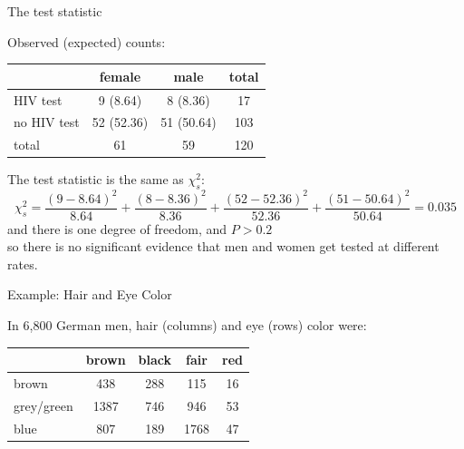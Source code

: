 \begin{frame}{The test statistic}

    Observed (expected) counts:
        \begin{center}
            \begin{tabular}{lcc|c}
                & female & male & total \\
                \hline
                HIV test & 9 (8.64) & 8 (8.36) & 17 \\
                no HIV test & 52 (52.36) & 51 (50.64) & 103 \\
                \hline
                total & 61 & 59 & 120 \\
            \end{tabular}
        \end{center}

    \vspace{2em}

    The test statistic is the \alert{same} as $\chi^2_s$:
    \[
        \chi^2_s = \frac{(9 - 8.64)^2}{8.64} + 
            \frac{(8 - 8.36)^2}{8.36} + 
            \frac{(52 - 52.36)^2}{52.36} + 
            \frac{(51 - 50.64)^2}{50.64} = 0.035
    \]
    and there is \alert{one} {degree of freedom}, and $P > 0.2$ \\
    so there is no significant evidence that men and women get tested at different rates.


\end{frame}

\begin{frame}{Example: Hair and Eye Color}

    In 6,800 German men, hair (columns) and eye (rows) color were:
        \begin{center}
            \begin{tabular}{l|cccc}
                & brown & black & fair & red \\
                \hline
                brown & 438 & 288 & 115 & 16 \\
                grey/green & 1387 & 746 & 946 & 53 \\
                blue & 807 & 189 & 1768 & 47 \\
            \end{tabular}
        \end{center}

\end{frame}


